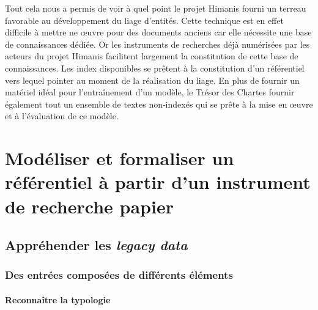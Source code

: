\documentclass[a4paper,12pt,twoside]{book}
\makeatletter
\newcommand{\parttext}[1]{\def\@parttext{#1}}
\makeatother
\begin{document}
	Tout cela nous a permis de voir à quel point le projet Himanis fourni un terreau favorable au développement du liage d'entités. Cette technique est en effet difficile à mettre ne œuvre pour des documents anciens car elle nécessite une base de connaissances dédiée. Or les instruments de recherches déjà numérisées par les acteurs du projet Himanis facilitent largement la constitution de cette base de connaissances. Les index disponibles se prêtent à la constitution d'un référentiel vers lequel pointer au moment de la réalisation du liage. En plus de fournir un matériel idéal pour l'entraînement d'un modèle, le Trésor des Chartes fournir également tout un ensemble de textes non-indexés qui se prête à la mise en œuvre et à l'évaluation de ce modèle.
	
	\parttext{Le stage que nous avons réalisé s'est principalement concentré sur la constitution d'un référentiel pouvant servir de base de connaissances pour la mise en œuvre du liage d'entités. Nous consacrerons donc cette deuxième partie au travail de modélisation et de formalisation du référentiel à partir d'un index papier, activité qui a occupé la majeure partie de notre stage. Nous nous sommes concentrés ici sur l'index du premier volume de l'inventaire analytique des registres du Trésor des Chartes portant sur les registres JJ 37 à JJ 50 et paru en 1958. Pour rendre compte de ce travail, nous décrirons dans un premier chapitre les différentes difficultés rencontrées pour comprendre et manipuler cet instrument de recherche. Puis nous dédierons un second chapitre à l'analyse des relations entre les entités. Nous consacrerons enfin un troisième chapitre à la transformation de l'index en une base de données relationnelle.}
	
	\part{Modéliser et formaliser un référentiel à partir d’un instrument de recherche papier}
	
	
	\chapter{Appréhender les \textit{legacy data}}
	
	\section{Des entrées composées de différents éléments}
	
	\subsection{Reconnaître la typologie}
	
\end{document}
